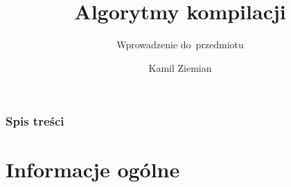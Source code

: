 \documentclass[10pt,t]{beamer}
\title{Algorytmy kompilacji}
\subtitle{Wprowadzenie do~przedmiotu}
\author{Kamil Ziemian}
\begin{document}





\RaggedRight





\maketitle





\begin{frame}
  \frametitle{Spis treści}


  \tableofcontents

\end{frame}





\section{Informacje ogólne}
\end{document}
